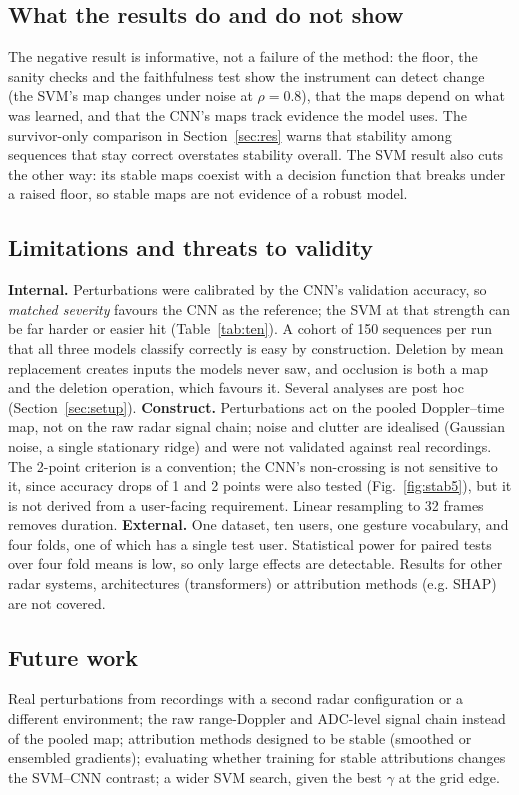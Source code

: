 \documentclass[11pt]{article}
\begin{document}
\subsection{What the results do and do not show}
The negative result is informative, not a failure of the method: the floor, the sanity checks and the faithfulness test show the instrument can detect change (the SVM's map changes under noise at $\rho=0.8$), that the maps depend on what was learned, and that the CNN's maps track evidence the model uses. The survivor-only comparison in Section~\ref{sec:res} warns that stability among sequences that stay correct overstates stability overall. The SVM result also cuts the other way: its stable maps coexist with a decision function that breaks under a raised floor, so stable maps are not evidence of a robust model.

\subsection{Limitations and threats to validity}
\textbf{Internal.} Perturbations were calibrated by the CNN's validation accuracy, so \emph{matched severity} favours the CNN as the reference; the SVM at that strength can be far harder or easier hit (Table~\ref{tab:ten}). A cohort of 150 sequences per run that all three models classify correctly is easy by construction. Deletion by mean replacement creates inputs the models never saw, and occlusion is both a map and the deletion operation, which favours it. Several analyses are post hoc (Section~\ref{sec:setup}). \textbf{Construct.} Perturbations act on the pooled Doppler--time map, not on the raw radar signal chain; noise and clutter are idealised (Gaussian noise, a single stationary ridge) and were not validated against real recordings. The 2-point criterion is a convention; the CNN's non-crossing is not sensitive to it, since accuracy drops of 1 and 2 points were also tested (Fig.~\ref{fig:stab5}), but it is not derived from a user-facing requirement. Linear resampling to 32 frames removes duration. \textbf{External.} One dataset, ten users, one gesture vocabulary, and four folds, one of which has a single test user. Statistical power for paired tests over four fold means is low, so only large effects are detectable. Results for other radar systems, architectures (transformers) or attribution methods (e.g. SHAP) are not covered.

\subsection{Future work}
Real perturbations from recordings with a second radar configuration or a different environment; the raw range-Doppler and ADC-level signal chain instead of the pooled map; attribution methods designed to be stable (smoothed or ensembled gradients); evaluating whether training for stable attributions changes the SVM--CNN contrast; a wider SVM search, given the best $\gamma$ at the grid edge.
\end{document}
